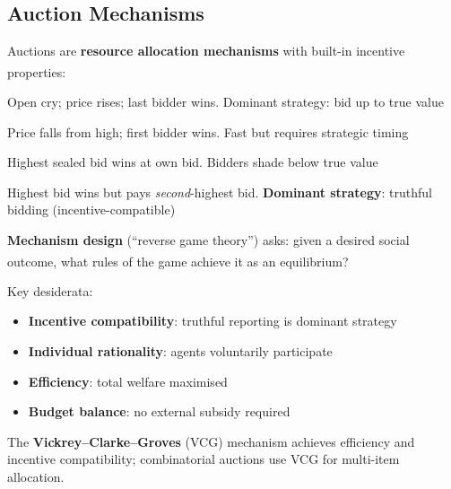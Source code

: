 \subsection{Auction Mechanisms}
\begin{tcbitemize}[ skin=sectionraster ]

    \tcbitem[title=Auction Types, raster multicolumn=4]
    Auctions are \textbf{resource allocation mechanisms} with built-in incentive
    properties:\textsuperscript{\cite[][Ch.~11]{shohamMultiagentSystemsAlgorithmic2009}}
    \begin{description}[leftmargin=0.6cm, labelindent=0pt]
        \item[\textbf{English (ascending)}] Open cry; price rises; last bidder wins.
              Dominant strategy: bid up to true value
        \item[\textbf{Dutch (descending)}] Price falls from high; first bidder wins.
              Fast but requires strategic timing
        \item[\textbf{First-price sealed-bid}] Highest sealed bid wins at own bid.
              Bidders shade below true value
        \item[\textbf{Vickrey (second-price sealed-bid)}] Highest bid wins but pays
              \emph{second}-highest bid. \textbf{Dominant strategy}: truthful bidding
              (incentive-compatible)
    \end{description}

    \tcbitem[title=Mechanism Design, raster multicolumn=2]
    \textbf{Mechanism design} (``reverse game theory'') asks: given a desired
    social outcome, what rules of the game achieve it as an
    equilibrium?\textsuperscript{\cite[][p.~280]{shohamMultiagentSystemsAlgorithmic2009}}

    Key desiderata:
    \begin{itemize}
        \item \textbf{Incentive compatibility}: truthful reporting is dominant strategy
        \item \textbf{Individual rationality}: agents voluntarily participate
        \item \textbf{Efficiency}: total welfare maximised
        \item \textbf{Budget balance}: no external subsidy required
    \end{itemize}
    The \textbf{Vickrey--Clarke--Groves} (VCG) mechanism achieves
    efficiency and incentive compatibility; combinatorial auctions use VCG
    for multi-item allocation.

\end{tcbitemize}


